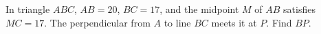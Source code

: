 In triangle $ ABC $, $ AB=20 $, $ BC=17 $, and the midpoint $ M $ of $ AB $ satisfies $ MC=17 $. The perpendicular from $ A $ to line $ BC $ meets it at $ P $. Find $ BP $.
